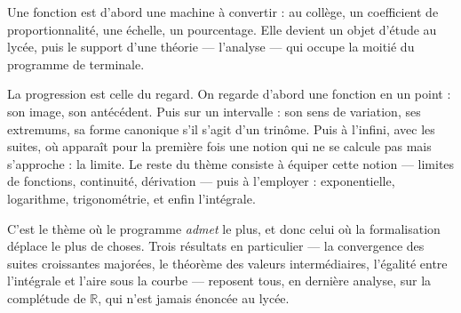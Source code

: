 Une fonction est d'abord une machine à convertir : au collège, un coefficient de
proportionnalité, une échelle, un pourcentage. Elle devient un objet d'étude au lycée, puis
le support d'une théorie — l'analyse — qui occupe la moitié du programme de terminale.

La progression est celle du regard. On regarde d'abord une fonction en un point : son image,
son antécédent. Puis sur un intervalle : son sens de variation, ses extremums, sa forme
canonique s'il s'agit d'un trinôme. Puis à l'infini, avec les suites, où apparaît pour la
première fois une notion qui ne se calcule pas mais s'approche : la limite. Le reste du thème
consiste à équiper cette notion — limites de fonctions, continuité, dérivation — puis à
l'employer : exponentielle, logarithme, trigonométrie, et enfin l'intégrale.

C'est le thème où le programme \emph{admet} le plus, et donc celui où la formalisation
déplace le plus de choses. Trois résultats en particulier — la convergence des suites
croissantes majorées, le théorème des valeurs intermédiaires, l'égalité entre l'intégrale et
l'aire sous la courbe — reposent tous, en dernière analyse, sur la complétude de $\mathbb{R}$,
qui n'est jamais énoncée au lycée.
